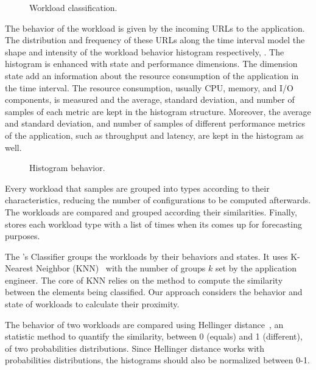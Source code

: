 \begin{figure*}[htp]
    \centering
    \def\svgwidth{\textwidth}
    \scalebox{1.0}{}
    \caption{Workload classification.}
    \label{fig:workload-classification}
\end{figure*}

The behavior of the workload is given by the incoming URLs to the application.
The distribution and frequency of these URLs along the time interval model the
shape and intensity of the workload behavior histogram respectively,
.  The histogram is enhanced with state and performance
dimensions. The dimension state add an information about the resource
consumption of the application in the time interval. The resource consumption,
usually CPU, memory, and I/O components, is measured and the average, standard
deviation, and number of samples of each metric are kept in the histogram
structure.  Moreover, the average and standard deviation, and number of samples
of different performance metrics of the application, such as throughput and
latency, are kept in the histogram as well.

\begin{figure*}[htp]
  \centering
  \def\svcwidth{\textwidth}
  \scalebox{1.0}{}
  \caption{Histogram behavior.}
  \label{fig:histogram}
\end{figure*}

Every workload that \name samples are grouped into types according to their
characteristics, reducing the number of configurations to be computed
afterwards. The workloads are compared and grouped according their similarities.
Finally, \name stores each workload type with a list of times when its comes up
for forecasting purposes.

The \name's Classifier groups the workloads by their behaviors and states. It
uses K-Nearest Neighbor (KNN)~\cite{?} with the number of groups $k$ set by the
application engineer. The core of KNN relies on the method to compute the
similarity between the elements being classified. Our approach considers the
behavior and state of workloads to calculate their proximity.


The behavior of two workloads are compared using Hellinger distance~\cite{?}, an
statistic method to quantify the similarity, between 0 (equals) and 1
(different), of two probabilities distributions. Since Hellinger distance works
with probabilities distributions, the histograms should also be normalized
between 0-1.

